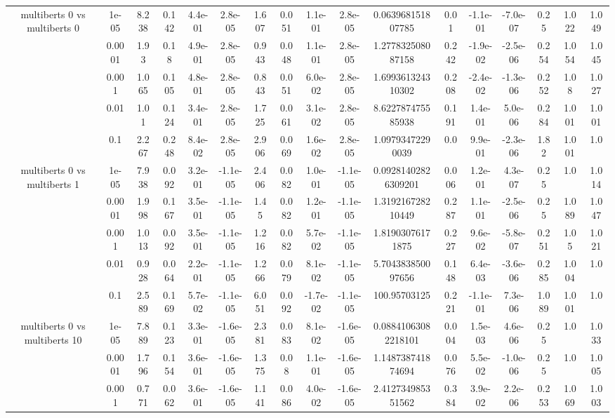 \begin{tabular}{|c|c|c|c|c|c|c|c|c|c|c|c|c|c|c|c|c|}
\hline
\multirow{5}{*}{multiberts 0 vs multiberts 0} & 1e-05 & 8.238 & 0.142 & 4.4e-01 & 2.8e-05 & 1.607 & 0.051 & 1.1e-01 & 2.8e-05 & 0.063968151807785 & 0.01 & -1.1e-01 & -7.0e-07 & 0.25 & 1.022 & 1.049 \\
 & 0.0001 & 1.93 & 0.18 & 4.9e-01 & 2.8e-05 & 0.943 & 0.048 & 1.1e-01 & 2.8e-05 & 1.277832508087158 & 0.242 & -1.9e-02 & -2.5e-06 & 0.254 & 1.054 & 1.045 \\
 & 0.001 & 1.065 & 0.105 & 4.8e-01 & 2.8e-05 & 0.843 & 0.051 & 6.0e-02 & 2.8e-05 & 1.699361324310302 & 0.208 & -2.4e-02 & -1.3e-06 & 0.252 & 1.08 & 1.027 \\
 & 0.01 & 1.01 & 0.124 & 3.4e-01 & 2.8e-05 & 1.725 & 0.061 & 3.1e-02 & 2.8e-05 & 8.622787475585938 & 0.191 & 1.4e-01 & 5.0e-06 & 0.284 & 1.001 & 1.001 \\
 & 0.1 & 2.267 & 0.248 & 8.4e-02 & 2.8e-05 & 2.906 & 0.069 & 1.6e-02 & 2.8e-05 & 1.09793472290039 & 0.0 & 9.9e-01 & -2.3e-06 & 1.82 & 1.001 & 1.0 \\
\hline
\multirow{5}{*}{multiberts 0 vs multiberts 1} & 1e-05 & 7.938 & 0.092 & 3.2e-01 & -1.1e-05 & 2.406 & 0.082 & 1.0e-01 & -1.1e-05 & 0.09281402826309201 & 0.006 & 1.2e-01 & 4.3e-07 & 0.25 & 1.0 & 1.014 \\
 & 0.0001 & 1.998 & 0.167 & 3.5e-01 & -1.1e-05 & 1.45 & 0.082 & 1.2e-01 & -1.1e-05 & 1.319216728210449 & 0.287 & 1.1e-01 & -2.5e-06 & 0.25 & 1.089 & 1.047 \\
 & 0.001 & 1.013 & 0.092 & 3.5e-01 & -1.1e-05 & 1.216 & 0.082 & 5.7e-02 & -1.1e-05 & 1.81903076171875 & 0.227 & 9.6e-02 & -5.8e-07 & 0.251 & 1.05 & 1.021 \\
 & 0.01 & 0.928 & 0.064 & 2.2e-01 & -1.1e-05 & 1.266 & 0.079 & 8.1e-02 & -1.1e-05 & 5.704383850097656 & 0.148 & 6.4e-03 & -3.6e-06 & 0.285 & 1.004 & 1.0 \\
 & 0.1 & 2.589 & 0.169 & 5.7e-02 & -1.1e-05 & 6.051 & 0.092 & -1.7e-02 & -1.1e-05 & 100.95703125 & 0.221 & -1.1e-01 & 7.3e-06 & 1.089 & 1.001 & 1.0 \\
\hline
\multirow{5}{*}{multiberts 0 vs multiberts 10} & 1e-05 & 7.889 & 0.123 & 3.3e-01 & -1.6e-05 & 2.381 & 0.083 & 8.1e-02 & -1.6e-05 & 0.08841063082218101 & 0.004 & 1.5e-03 & 4.6e-06 & 0.25 & 1.0 & 1.033 \\
 & 0.0001 & 1.796 & 0.154 & 3.6e-01 & -1.6e-05 & 1.375 & 0.08 & 1.1e-01 & -1.6e-05 & 1.148738741874694 & 0.076 & 5.5e-02 & -1.0e-06 & 0.25 & 1.0 & 1.005 \\
 & 0.001 & 0.771 & 0.062 & 3.6e-01 & -1.6e-05 & 1.141 & 0.086 & 4.0e-02 & -1.6e-05 & 2.412734985351562 & 0.384 & 3.9e-02 & 2.2e-06 & 0.253 & 1.069 & 1.003 \\

\end{tabular}
